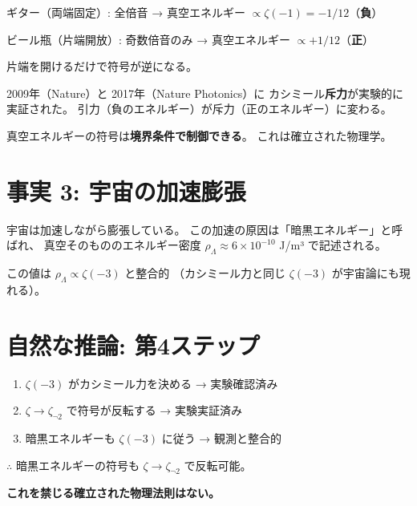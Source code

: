 \documentclass[12pt,a4paper]{article}
\begin{document}
\begin{storybox}[ギターとビール瓶]
ギター（両端固定）: 全倍音 → 真空エネルギー $\propto \zeta(-1) = -1/12$（\textbf{負}）

ビール瓶（片端開放）: 奇数倍音のみ → 真空エネルギー $\propto +1/12$（\textbf{正}）

片端を開けるだけで符号が逆になる。

2009年（Nature）と 2017年（Nature Photonics）に
カシミール\textbf{斥力}が実験的に実証された。
引力（負のエネルギー）が斥力（正のエネルギー）に変わる。
\end{storybox}

\begin{resultbox}[意味]
真空エネルギーの符号は\textbf{境界条件で制御できる}。
これは確立された物理学。
\end{resultbox}

\section{事実 3: 宇宙の加速膨張}

\begin{storybox}[暗黒エネルギー]
宇宙は加速しながら膨張している。
この加速の原因は「暗黒エネルギー」と呼ばれ、
真空そのもののエネルギー密度 $\rho_\Lambda \approx 6 \times 10^{-10}$ J/m³ で記述される。

この値は $\rho_\Lambda \propto \zeta(-3)$ と整合的
（カシミール力と同じ $\zeta(-3)$ が宇宙論にも現れる）。
\end{storybox}

\section{自然な推論: 第4ステップ}

\begin{resultbox}[3つの事実からの論理的帰結]
\begin{enumerate}
\item $\zeta(-3)$ がカシミール力を決める → 実験確認済み
\item $\zeta \to \zeta_{\neg 2}$ で符号が反転する → 実験実証済み
\item 暗黒エネルギーも $\zeta(-3)$ に従う → 観測と整合的
\end{enumerate}

$\therefore$ 暗黒エネルギーの符号も $\zeta \to \zeta_{\neg 2}$ で反転可能。

\textbf{これを禁じる確立された物理法則はない。}
\end{resultbox}
\end{document}
